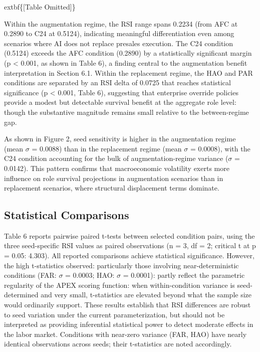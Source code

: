 \documentclass[10pt, conference]{IEEEtran}
\begin{document}
	extbf\{[Table Omitted]\}

Within the augmentation regime, the RSI range spans 0.2234 (from AFC at 0.2890 to C24 at 0.5124), indicating meaningful differentiation even among scenarios where AI does not replace presales execution. The C24 condition (0.5124) exceeds the AFC condition (0.2890) by a statistically significant margin (p < 0.001, as shown in Table 6), a finding central to the augmentation benefit interpretation in Section 6.1. Within the replacement regime, the HAO and PAR conditions are separated by an RSI delta of 0.0725 that reaches statistical significance (p < 0.001, Table 6), suggesting that enterprise override policies provide a modest but detectable survival benefit at the aggregate role level: though the substantive magnitude remains small relative to the between-regime gap.

As shown in Figure 2, seed sensitivity is higher in the augmentation regime (mean $\sigma$ = 0.0088) than in the replacement regime (mean $\sigma$ = 0.0008), with the C24 condition accounting for the bulk of augmentation-regime variance ($\sigma$ = 0.0142). This pattern confirms that macroeconomic volatility exerts more influence on role survival projections in augmentation scenarios than in replacement scenarios, where structural displacement terms dominate.



\subsection{Statistical Comparisons}

\label{sec:statistical_comparisons}

Table 6 reports pairwise paired t-tests between selected condition pairs, using the three seed-specific RSI values as paired observations (n = 3, df = 2; critical t at p = 0.05: 4.303). All reported comparisons achieve statistical significance. However, the high t-statistics observed: particularly those involving near-deterministic conditions (FAR: $\sigma$ = 0.0003; HAO: $\sigma$ = 0.0001): partly reflect the parametric regularity of the APEX scoring function: when within-condition variance is seed-determined and very small, t-statistics are elevated beyond what the sample size would ordinarily support. These results establish that RSI differences are robust to seed variation under the current parameterization, but should not be interpreted as providing inferential statistical power to detect moderate effects in the labor market. Conditions with near-zero variance (FAR, HAO) have nearly identical observations across seeds; their t-statistics are noted accordingly.
\end{document}

